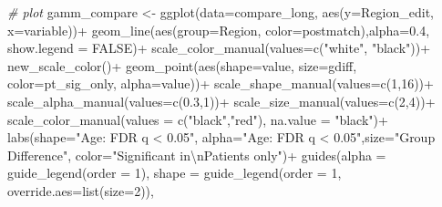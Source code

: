 \documentclass[
]{article}
\newenvironment{Shaded}{\begin{snugshade}}{\end{snugshade}}
\newcommand{\AttributeTok}[1]{\textcolor[rgb]{0.77,0.63,0.00}{#1}}
\newcommand{\CommentTok}[1]{\textcolor[rgb]{0.56,0.35,0.01}{\textit{#1}}}
\newcommand{\ConstantTok}[1]{\textcolor[rgb]{0.00,0.00,0.00}{#1}}
\newcommand{\DecValTok}[1]{\textcolor[rgb]{0.00,0.00,0.81}{#1}}
\newcommand{\FloatTok}[1]{\textcolor[rgb]{0.00,0.00,0.81}{#1}}
\newcommand{\FunctionTok}[1]{\textcolor[rgb]{0.00,0.00,0.00}{#1}}
\newcommand{\NormalTok}[1]{#1}
\newcommand{\OtherTok}[1]{\textcolor[rgb]{0.56,0.35,0.01}{#1}}
\newcommand{\SpecialCharTok}[1]{\textcolor[rgb]{0.00,0.00,0.00}{#1}}
\newcommand{\StringTok}[1]{\textcolor[rgb]{0.31,0.60,0.02}{#1}}
\begin{document}
\begin{Shaded}
\begin{Highlighting}[]
  \CommentTok{\# plot}
\NormalTok{  gamm\_compare }\OtherTok{\textless{}{-}} \FunctionTok{ggplot}\NormalTok{(}\AttributeTok{data=}\NormalTok{compare\_long, }\FunctionTok{aes}\NormalTok{(}\AttributeTok{y=}\NormalTok{Region\_edit, }\AttributeTok{x=}\NormalTok{variable))}\SpecialCharTok{+}
    \FunctionTok{geom\_line}\NormalTok{(}\FunctionTok{aes}\NormalTok{(}\AttributeTok{group=}\NormalTok{Region, }\AttributeTok{color=}\NormalTok{postmatch),}\AttributeTok{alpha=}\FloatTok{0.4}\NormalTok{, }\AttributeTok{show.legend =} \ConstantTok{FALSE}\NormalTok{)}\SpecialCharTok{+}
    \FunctionTok{scale\_color\_manual}\NormalTok{(}\AttributeTok{values=}\FunctionTok{c}\NormalTok{(}\StringTok{"white"}\NormalTok{, }\StringTok{"black"}\NormalTok{))}\SpecialCharTok{+}
    \FunctionTok{new\_scale\_color}\NormalTok{()}\SpecialCharTok{+}
    \FunctionTok{geom\_point}\NormalTok{(}\FunctionTok{aes}\NormalTok{(}\AttributeTok{shape=}\NormalTok{value, }\AttributeTok{size=}\NormalTok{gdiff, }\AttributeTok{color=}\NormalTok{pt\_sig\_only, }\AttributeTok{alpha=}\NormalTok{value))}\SpecialCharTok{+}
    \FunctionTok{scale\_shape\_manual}\NormalTok{(}\AttributeTok{values=}\FunctionTok{c}\NormalTok{(}\DecValTok{1}\NormalTok{,}\DecValTok{16}\NormalTok{))}\SpecialCharTok{+}
    \FunctionTok{scale\_alpha\_manual}\NormalTok{(}\AttributeTok{values=}\FunctionTok{c}\NormalTok{(}\FloatTok{0.3}\NormalTok{,}\DecValTok{1}\NormalTok{))}\SpecialCharTok{+}
    \FunctionTok{scale\_size\_manual}\NormalTok{(}\AttributeTok{values=}\FunctionTok{c}\NormalTok{(}\DecValTok{2}\NormalTok{,}\DecValTok{4}\NormalTok{))}\SpecialCharTok{+}
    \FunctionTok{scale\_color\_manual}\NormalTok{(}\AttributeTok{values =} \FunctionTok{c}\NormalTok{(}\StringTok{"black"}\NormalTok{,}\StringTok{"red"}\NormalTok{), }\AttributeTok{na.value =} \StringTok{"black"}\NormalTok{)}\SpecialCharTok{+}
    \FunctionTok{labs}\NormalTok{(}\AttributeTok{shape=}\StringTok{"Age: FDR q \textless{} 0.05"}\NormalTok{, }\AttributeTok{alpha=}\StringTok{"Age: FDR q \textless{} 0.05"}\NormalTok{,}\AttributeTok{size=}\StringTok{"Group Difference"}\NormalTok{, }\AttributeTok{color=}\StringTok{"Significant in}\SpecialCharTok{\textbackslash{}n}\StringTok{Patients only"}\NormalTok{)}\SpecialCharTok{+}
    \FunctionTok{guides}\NormalTok{(}\AttributeTok{alpha =} \FunctionTok{guide\_legend}\NormalTok{(}\AttributeTok{order =} \DecValTok{1}\NormalTok{),}
           \AttributeTok{shape =} \FunctionTok{guide\_legend}\NormalTok{(}\AttributeTok{order =} \DecValTok{1}\NormalTok{, }\AttributeTok{override.aes=}\FunctionTok{list}\NormalTok{(}\AttributeTok{size=}\DecValTok{2}\NormalTok{)),}

\end{Highlighting}
\end{Shaded}
\end{document}
